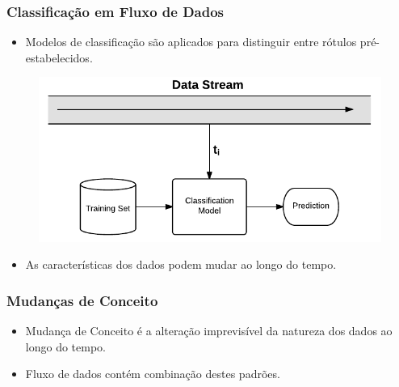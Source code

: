 \documentclass[14pt]{beamer}
\begin{document}
\begin{frame}\frametitle{Classificação em Fluxo de Dados}

\begin{itemize}
\item Modelos de classificação são aplicados para distinguir entre rótulos pré-estabelecidos.
\end{itemize}

\vspace{-0.2in}
\begin{figure}
\centering
\includegraphics[scale=0.6]{Stream1}
\end{figure}
\vspace{-0.2in}
\begin{itemize}
\item \alert{As características dos dados podem mudar ao longo do tempo}.
\end{itemize}
\end{frame}

\begin{frame}\frametitle{Mudanças de Conceito}
\begin{itemize}
\item Mudança de Conceito é a alteração imprevisível da natureza dos dados ao longo do tempo.
\end{itemize}

\vspace{-0.5in}

\vspace{-0.5in}
\pause

\begin{itemize}
\item Fluxo de dados contém combinação destes padrões.
\end{itemize}
\end{frame}
\end{document}
